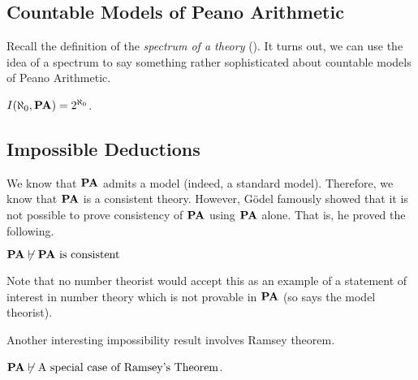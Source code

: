 

\subsection{Countable Models of Peano Arithmetic}

Recall the definition of the \textit{spectrum of a theory} (). It turns out, we can use the idea of a spectrum to say something rather sophisticated about countable models of Peano Arithmetic.

\begin{boxtheorem}
    $I\!\left( \aleph_0, \mathbf{PA} \right) = 2^{\aleph_0}$.
\end{boxtheorem}

\subsection{Impossible Deductions}

We know that $\mathbf{PA}$ admits a model (indeed, a standard model). Therefore, we know that $\mathbf{PA}$ is a consistent theory. However, Gödel famously showed that it is not possible to prove consistency of $\mathbf{PA}$ using $\mathbf{PA}$ alone. That is, he proved the following.

\begin{boxtheorem}
    $\mathbf{PA} \not\vdash \mathbf{PA} \text{ is consistent}$
\end{boxtheorem}
\begin{remark}
    Note that no number theorist would accept this as an example of a statement of interest in number theory which is not provable in $\mathbf{PA}$ (so says the model theorist). 
\end{remark}

Another interesting impossibility result involves Ramsey theorem.

\begin{boxtheorem}
    $\mathbf{PA} \not\vdash \text{A special case of Ramsey's Theorem}$.
\end{boxtheorem}


